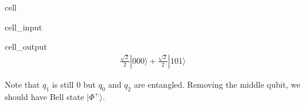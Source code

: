 \documentclass[letterpaper,10pt,english]{jupyterBook}
\begin{document}
\begin{sphinxuseclass}{cell}\begin{sphinxVerbatimInput}

\begin{sphinxuseclass}{cell_input}
\begin{sphinxVerbatim}[commandchars=\\\{\}]
    
\end{sphinxVerbatim}

\end{sphinxuseclass}\end{sphinxVerbatimInput}
\begin{sphinxVerbatimOutput}

\begin{sphinxuseclass}{cell_output}\begin{equation*}
\begin{split}\frac{\sqrt{2}}{2} |000\rangle+\frac{\sqrt{2}}{2} |101\rangle\end{split}
\end{equation*}
\end{sphinxuseclass}\end{sphinxVerbatimOutput}

\end{sphinxuseclass}
\sphinxAtStartPar
Note that \(q_1\) is still 0 but \(q_0\) and \(q_2\) are entangled.  Removing the middle qubit, we should have Bell state \(|\Phi^{+}\rangle\).
\end{document}
